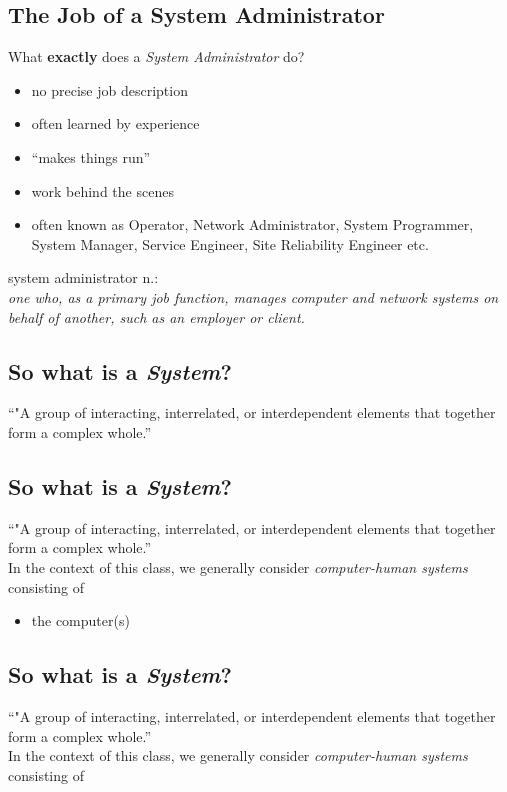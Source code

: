 \documentclass[xga]{xdvislides}
\begin{document}
\subsection{The Job of a System Administrator}
What {\bf exactly} does a {\em System Administrator} do?
\begin{itemize}
	\item no precise job description
	\item often learned by experience
	\item ``makes things run''
	\item work behind the scenes
	\item often known as Operator, Network Administrator, System Programmer, System
		Manager, Service Engineer, Site Reliability Engineer etc.
\end{itemize}
\vfill
system administrator n.: \\
{\em one who, as a primary job function,
	manages computer and network systems on behalf of another, such as an
	employer or client.}

\subsection{So what is a {\em System}?}
``"A group of interacting, interrelated, or interdependent elements that
together form a complex whole.''


\subsection{So what is a {\em System}?}
``"A group of interacting, interrelated, or interdependent elements that
together form a complex whole.''
\\

In the context of this class, we generally consider {\em computer-human
systems} consisting of

\begin{itemize}
	\item the computer(s)
\end{itemize}

\subsection{So what is a {\em System}?}
``"A group of interacting, interrelated, or interdependent elements that
together form a complex whole.''
\\

In the context of this class, we generally consider {\em computer-human
systems} consisting of
\end{document}

